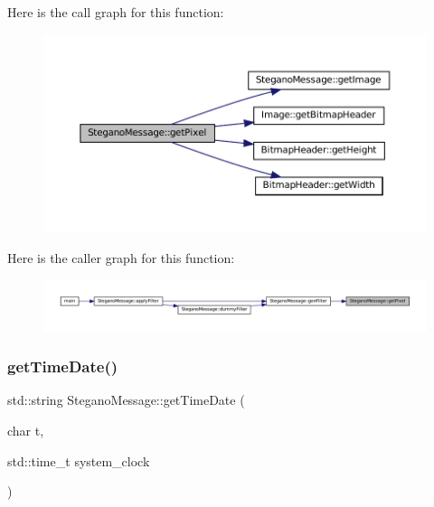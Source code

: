 Here is the call graph for this function\+:\nopagebreak
\begin{figure}[H]
\begin{center}
\leavevmode
\includegraphics[width=350pt]{classSteganoMessage_a12231d3596b90fe4c6d67bd694b27d07_cgraph}
\end{center}
\end{figure}
Here is the caller graph for this function\+:\nopagebreak
\begin{figure}[H]
\begin{center}
\leavevmode
\includegraphics[width=350pt]{classSteganoMessage_a12231d3596b90fe4c6d67bd694b27d07_icgraph}
\end{center}
\end{figure}
\mbox{\label{classSteganoMessage_a9aaa5e476220c95e1a68b4d722de43b1}} 
\subsubsection{\texorpdfstring{getTimeDate()}{getTimeDate()}}
{\footnotesize\ttfamily std\+::string Stegano\+Message\+::get\+Time\+Date (\begin{DoxyParamCaption}\item[{char}]{t,  }\item[{std\+::time\+\_\+t}]{system\+\_\+clock }\end{DoxyParamCaption})\hspace{0.3cm}{\ttfamily [static]}}



